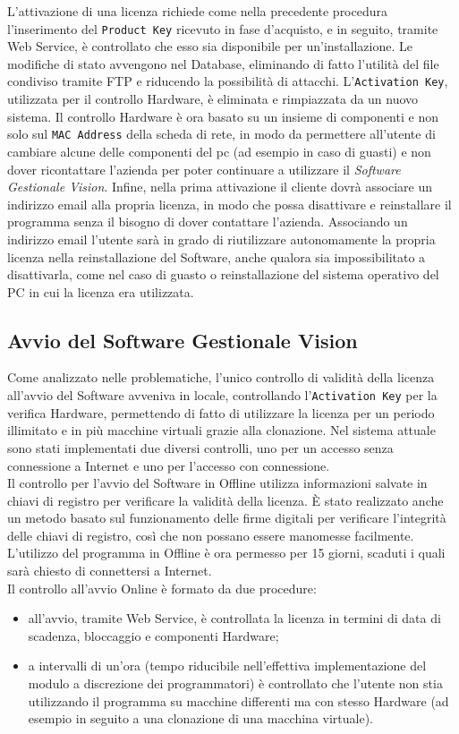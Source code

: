 L'attivazione di una licenza richiede come nella precedente procedura l'inserimento del \texttt{Product Key} ricevuto in fase d'acquisto, e in seguito, tramite Web Service, è controllato che esso sia disponibile per un'installazione. Le modifiche di stato avvengono nel Database, eliminando di fatto l'utilità del file condiviso tramite FTP e riducendo la possibilità di attacchi. L’\texttt{Activation Key}, utilizzata per il controllo Hardware, è eliminata e rimpiazzata da un nuovo sistema. Il controllo Hardware è ora basato su un insieme di componenti e non solo sul \texttt{MAC Address} della scheda di rete, in modo da permettere all’utente di cambiare alcune delle componenti del pc (ad esempio in caso di guasti) e non dover ricontattare l’azienda per poter continuare a utilizzare il \textit{Software Gestionale Vision}. 
Infine, nella prima attivazione il cliente dovrà associare un indirizzo email alla propria licenza, in modo che possa disattivare e reinstallare il programma senza il bisogno di dover contattare l’azienda. Associando un indirizzo email l'utente sarà in grado di riutilizzare autonomamente la propria licenza nella reinstallazione del Software, anche qualora sia impossibilitato a disattivarla, come nel caso di guasto o reinstallazione del sistema operativo del PC in cui la licenza era utilizzata.


\subsection{Avvio del Software Gestionale Vision}

Come analizzato nelle problematiche, l'unico controllo di validità della licenza all'avvio del Software avveniva in locale, controllando l'\texttt{Activation Key} per la verifica Hardware, permettendo di fatto di utilizzare la licenza per un periodo illimitato e in più macchine virtuali grazie alla clonazione. Nel sistema attuale sono stati implementati due  diversi controlli, uno per un accesso senza connessione a Internet e uno per l’accesso con connessione.
\\
Il controllo per l’avvio del Software in Offline utilizza informazioni salvate in chiavi di registro per verificare la validità della licenza. È stato realizzato anche un metodo basato sul funzionamento delle firme digitali per verificare l’integrità delle chiavi di registro, così che non possano essere manomesse facilmente. L’utilizzo del programma in Offline è ora permesso per 15 giorni, scaduti i quali sarà chiesto di connettersi a Internet.
\\
Il controllo all'avvio Online è formato da due procedure:
\begin{itemize}
\item all'avvio, tramite Web Service, è controllata la licenza in termini di data di scadenza, bloccaggio e componenti Hardware;
\item a intervalli di un'ora (tempo riducibile nell'effettiva implementazione del modulo a discrezione dei programmatori) è controllato che l'utente non stia utilizzando il programma su macchine differenti ma con stesso Hardware (ad esempio in seguito a una clonazione di una macchina virtuale).

\end{itemize}

